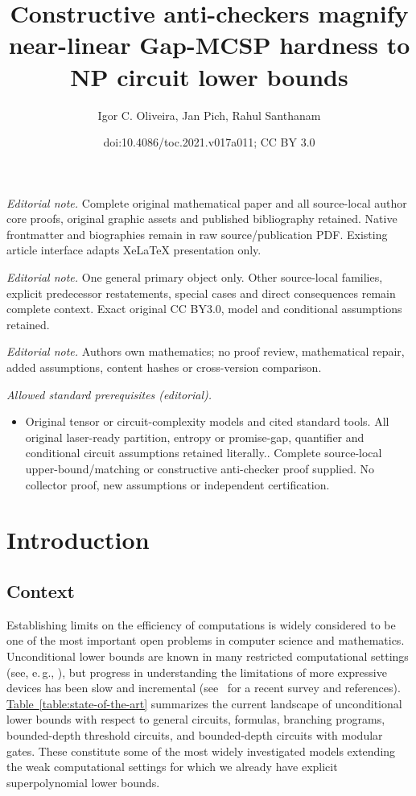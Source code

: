 \documentclass[11pt]{article}
\title{Constructive anti-checkers magnify near-linear Gap-MCSP hardness to NP circuit lower bounds}
\author{Igor C. Oliveira, Jan Pich, Rahul Santhanam}
\date{doi:10.4086/toc.2021.v017a011; CC BY 3.0}
\numberwithin{equation}{section}
\theoremstyle{definition}
\theoremstyle{plain}
\newcommand{\eg}{e.\,g.}
\newcommand{\expref}[2]{\hyperref[#2]{#1~\ref{#2}}}
\begin{document}
\maketitle
\noindent\textit{Editorial note.} Complete original mathematical paper and all source-local author core proofs, original graphic assets and published bibliography retained. Native frontmatter and biographies remain in raw source/publication PDF. Existing article interface adapts XeLaTeX presentation only.\par\medskip
\noindent\textit{Editorial note.} One general primary object only. Other source-local families, explicit predecessor restatements, special cases and direct consequences remain complete context. Exact original CC BY3.0, model and conditional assumptions retained.\par\medskip
\noindent\textit{Editorial note.} Authors own mathematics; no proof review, mathematical repair, added assumptions, content hashes or cross-version comparison.\par\medskip
\noindent\textit{Allowed standard prerequisites (editorial).}\begin{itemize}
\item Original tensor or circuit-complexity models and cited standard tools. All original laser-ready partition, entropy or promise-gap, quantifier and conditional circuit assumptions retained literally.. Complete source-local upper-bound/matching or constructive anti-checker proof supplied. No collector proof, new assumptions or independent certification.
\end{itemize}\medskip
\section{Introduction}

\subsection{Context}

Establishing limits on the efficiency of computations is widely considered to be one of the most important open problems in computer science and mathematics. Unconditional lower bounds are known in many restricted computational settings (see, \eg, \cite{DBLP:books/el/leeuwen90/BoppanaS90, DBLP:books/daglib/0028687}), but progress in understanding the limitations of more expressive devices has been slow and incremental (see~\cite{DBLP:journals/eccc/Aaronson17} for a recent survey and references). \expref{Table}{table:state-of-the-art} summarizes the current landscape of unconditional lower bounds with respect to general circuits, formulas, branching programs, bounded-depth threshold circuits, and bounded-depth circuits with modular gates. These constitute some of the most widely investigated models extending the weak computational settings for which we already have explicit superpolynomial lower bounds.\\
\end{document}
